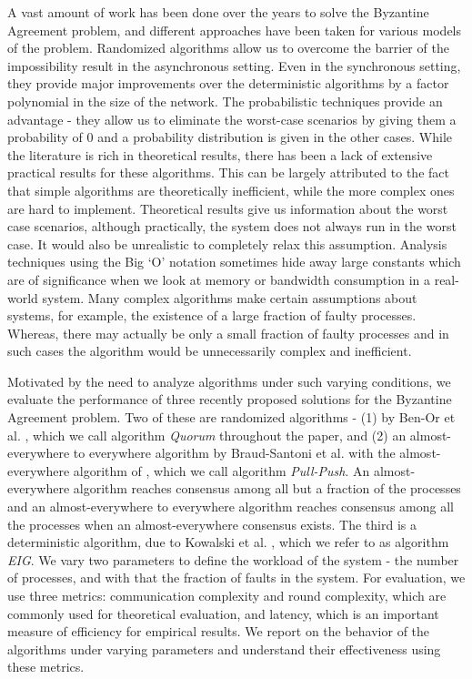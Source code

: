 A vast amount of work has been done over the years to solve the Byzantine Agreement problem, and different approaches have been taken for various models of the problem. Randomized algorithms allow us to overcome the barrier of the impossibility result in the asynchronous setting. Even in the synchronous setting, they provide major improvements over the deterministic algorithms by a factor polynomial in the size of the network. The probabilistic techniques provide an advantage - they allow us to eliminate the worst-case scenarios by giving them a probability of $0$ and a probability distribution is given in the other cases. While the literature is rich in theoretical results, there has been a lack of extensive practical results for these algorithms. This can be largely attributed to the fact that simple algorithms are theoretically inefficient, while the more complex ones are hard to implement. Theoretical results give us information about the worst case scenarios, although practically, the system does not always run in the worst case. It would also be unrealistic to completely relax this assumption. Analysis techniques using the Big `O' notation sometimes hide away large constants which are of significance when we look at memory or bandwidth consumption in a real-world system. Many complex algorithms make certain assumptions about systems, for example, the existence of a large fraction of faulty processes. Whereas, there may actually be only a small fraction of faulty processes and in such cases the algorithm would be unnecessarily complex and inefficient.

Motivated by the need to analyze algorithms under such varying conditions, we evaluate the performance of three recently proposed solutions for the Byzantine Agreement problem. Two of these are randomized algorithms - (1) by Ben-Or et al. \cite{BPV06}, which we call algorithm \textit{Quorum} throughout the paper, and (2) an almost-everywhere to everywhere algorithm by Braud-Santoni et al. \cite{BGH13} with the almost-everywhere algorithm of \cite{KSSV06}, which we call algorithm \textit{Pull-Push}. An almost-everywhere algorithm reaches consensus among all but a fraction of the processes and an almost-everywhere to everywhere algorithm reaches consensus among all the processes when an almost-everywhere consensus exists. The third is a deterministic algorithm, due to Kowalski et al. \cite{KM13}, which we refer to as algorithm \textit{EIG}. We vary two parameters to define the workload of the system - the number of processes, and with that the fraction of faults in the system. 
For evaluation, we use three metrics: communication complexity and round
complexity, which are commonly used for theoretical evaluation,
and latency, which is an important measure of efficiency for empirical
results. We report on the behavior of the algorithms under varying
parameters and understand their effectiveness using these metrics.


